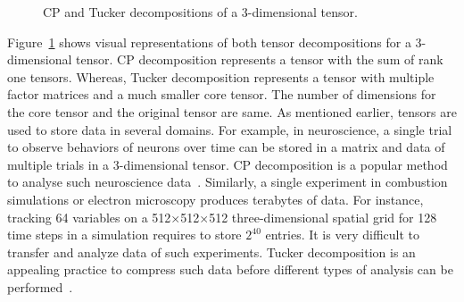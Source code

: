 \documentclass[a4paper,11pt]{article}
\newcommand{\bora}[1]{{\color{magenta} \emph{#1}}}
\renewcommand{\bora}[1]{}
\begin{document}
\begin{figure}[htb]
\begin{center}
{}
			\caption{CP and Tucker decompositions of a 3-dimensional tensor.\label{fig:CTdecompositions}}
		\end{center}		
	\end{figure}
	
	Figure~\ref{fig:CTdecompositions} shows visual representations of both tensor decompositions for a 3-dimensional tensor. CP decomposition represents a tensor with the sum of rank one tensors. Whereas, Tucker decomposition represents a tensor with multiple factor matrices and a much smaller core tensor. The number of dimensions for the core tensor and the original tensor are same. As mentioned earlier, tensors are used to store data in several domains. For example, in neuroscience, a single trial to observe behaviors of neurons over time can be stored in a matrix and data of multiple trials in a 3-dimensional tensor. CP decomposition is a popular method to analyse such neuroscience data~\cite{WKV-Neuron-2018,HKD-SIAM-2020}.
	Similarly, a single experiment in combustion simulations or electron microscopy produces terabytes of data. For instance, tracking 64 variables on a 512$\times$512$\times$512 three-dimensional spatial grid for 128 time steps in a simulation requires to store $2^{40}$ entries. It is very difficult to transfer and analyze data of such experiments. Tucker decomposition is an appealing practice to compress such data before different types of analysis can be performed~\cite{ABK-IPDPS-2016}.
	
	
	
\end{document}
